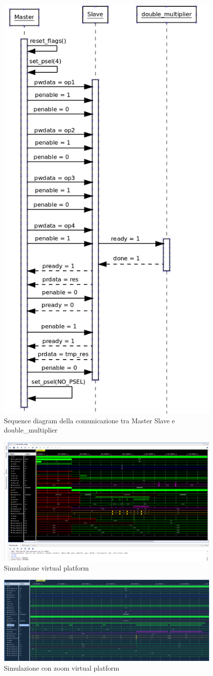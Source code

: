 \documentclass[]{IEEEtran}
\begin{document}
\begin{figure}[!htb]
    \centering
    \includegraphics[width=0.4\columnwidth]{figures/seq_diagram.png}
    \caption{Sequence diagram della comunicazione tra Master Slave e double\_multiplier}
    \label{fig:SEQ_DIAGRAM}
\end{figure}

\begin{figure}[!htb]
    \centering
    \includegraphics[width=0.4\columnwidth]{figures/sim.png}
    \caption{Simulazione virtual platform}
    \label{fig:SIM}
\end{figure}

\begin{figure}[!htb]
    \centering
    \includegraphics[width=0.4\columnwidth]{figures/sim_zoom.png}
    \caption{Simulazione con zoom virtual platform}
    \label{fig:SIM_ZOOM}
\end{figure}
\end{document}
